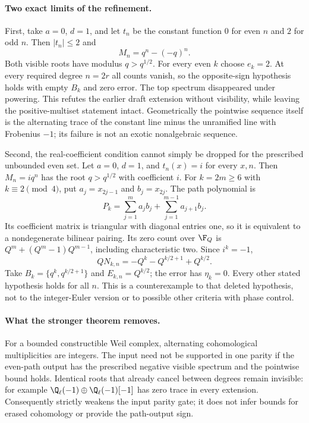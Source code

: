 \paragraph{Two exact limits of the refinement.}
First, take $a=0$, $d=1$, and let $t_n$ be the constant function $0$ for even
$n$ and $2$ for odd $n$. Then $|t_n|\le2$ and
\[
 M_n=q^n-(-q)^n.
\]
Both visible roots have modulus $q>q^{1/2}$. For every even $k$ choose
$e_k=2$. At every required degree $n=2r$ all counts vanish, so the
opposite-sign hypothesis holds with empty $B_k$ and zero error. The top
spectrum disappeared under powering. This refutes the earlier draft
extension without visibility, while leaving the positive-multiset
statement  intact. Geometrically the pointwise sequence itself
is the alternating trace of the constant line minus the unramified line
with Frobenius $-1$; its failure is not an exotic nonalgebraic sequence.

Second, the real-coefficient condition cannot simply be dropped for the
prescribed unbounded even set. Let $a=0$, $d=1$, and $t_n(x)=i$ for every
$x,n$. Then $M_n=iq^n$ has the root $q>q^{1/2}$ with coefficient $i$.
For $k=2m\ge6$ with $k\equiv2\pmod4$, put $a_j=x_{2j-1}$ and $b_j=x_{2j}$. The path
polynomial is
\[
 P_k=\sum_{j=1}^{m}a_jb_j+
       \sum_{j=1}^{m-1}a_{j+1}b_j.
\]
Its coefficient matrix is triangular with diagonal entries one, so it is
equivalent to a nondegenerate bilinear pairing. Its zero count over
$\F_Q$ is $Q^m+(Q^m-1)Q^{m-1}$, including characteristic two.
Since $i^k=-1$,
\[
 QN_{k,n}=-Q^k-Q^{k/2+1}+Q^{k/2}.
\]
Take $B_k=\{q^k,q^{k/2+1}\}$ and $E_{k,n}=Q^{k/2}$; the error has
$\eta_k=0$. Every other stated hypothesis holds for all $n$. This is a
counterexample to that deleted hypothesis, not to the integer-Euler
version or to possible other criteria with phase control.

\paragraph{What the stronger theorem removes.}
For a bounded constructible Weil complex, alternating cohomological
multiplicities are integers. The input need not be supported in one parity
if the even-path output has the prescribed negative visible spectrum and
the pointwise bound holds. Identical roots that already cancel between
degrees remain invisible: for example
$\Q_\ell(-1)\oplus\Q_\ell(-1)[-1]$ has zero trace in every extension.
Consequently  strictly weakens the input parity gate; it does not
infer bounds for erased cohomology or provide the path-output sign.


